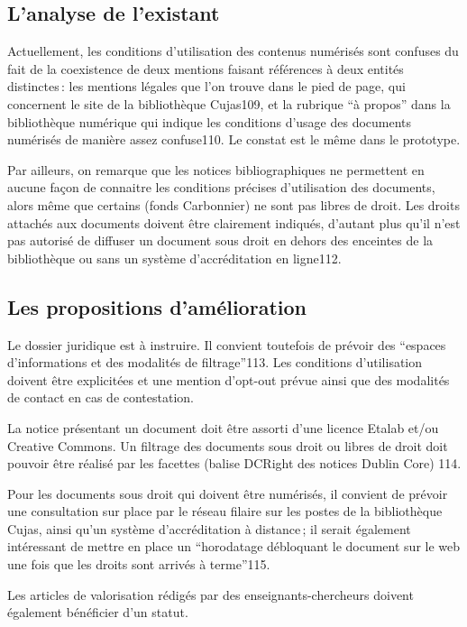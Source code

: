 \subsection{L’analyse de l’existant}

Actuellement, les conditions d’utilisation des contenus numérisés sont confuses du fait de la coexistence de deux mentions faisant références à deux entités distinctes : les mentions légales que l’on trouve dans le pied de page, qui concernent le site de la bibliothèque Cujas109, et la rubrique \enquote{à propos} dans la bibliothèque numérique qui indique les conditions d’usage des documents numérisés de manière assez confuse110. Le constat est le même dans le prototype. 

Par ailleurs, on remarque que les notices bibliographiques ne permettent en aucune façon de connaitre les conditions précises d’utilisation des documents, alors même que certains (fonds Carbonnier) ne sont pas libres de droit. Les droits attachés aux documents doivent être clairement indiqués, d’autant plus qu’il n’est pas autorisé de diffuser un document sous droit en dehors des enceintes de la bibliothèque ou sans un système d’accréditation en ligne112.  

\subsection{Les propositions d’amélioration}

Le dossier juridique est à instruire. Il convient toutefois de prévoir des \enquote{espaces d’informations et des modalités de filtrage}113. Les conditions d’utilisation doivent être explicitées et une mention d’opt-out prévue ainsi que des modalités de contact en cas de contestation.  

La notice présentant un document doit être assorti d’une licence Etalab et/ou Creative Commons. Un filtrage des documents sous droit ou libres de droit doit pouvoir être réalisé par les facettes (balise DCRight des notices Dublin Core) 114.  

Pour les documents sous droit qui doivent être numérisés, il convient de prévoir une consultation sur place par le réseau filaire sur les postes de la bibliothèque Cujas, ainsi qu’un système d’accréditation à distance ; il serait également intéressant de mettre en place un \enquote{horodatage débloquant le document sur le web une fois que les droits sont arrivés à terme}115.  

Les articles de valorisation rédigés par des enseignants-chercheurs doivent également bénéficier d’un statut. 

